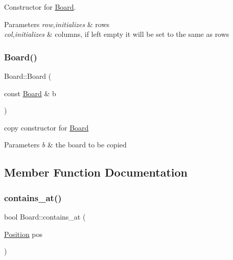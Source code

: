 Constructor for \hyperlink{class_board}{Board}. 


\begin{DoxyParams}{Parameters}
{\em row,initializes} & rows \\
\hline
{\em col,initializes} & columns, if left empty it will be set to the same as rows \\
\hline
\end{DoxyParams}
\mbox{\label{class_board_ac77f209904bb37545295c17649a9dc17}} 
\subsubsection{\texorpdfstring{Board()}{Board()}\hspace{0.1cm}{\footnotesize\ttfamily [2/2]}}
{\footnotesize\ttfamily Board\+::\+Board (\begin{DoxyParamCaption}\item[{const \hyperlink{class_board}{Board} \&}]{b }\end{DoxyParamCaption})}



copy constructor for \hyperlink{class_board}{Board} 


\begin{DoxyParams}{Parameters}
{\em b} & the board to be copied \\
\hline
\end{DoxyParams}


\subsection{Member Function Documentation}
\mbox{\label{class_board_a727409cb7ffce590a8d0bf2fc2524285}} 
\subsubsection{\texorpdfstring{contains\+\_\+at()}{contains\_at()}}
{\footnotesize\ttfamily bool Board\+::contains\+\_\+at (\begin{DoxyParamCaption}\item[{\hyperlink{struct_position}{Position}}]{pos }\end{DoxyParamCaption})}



